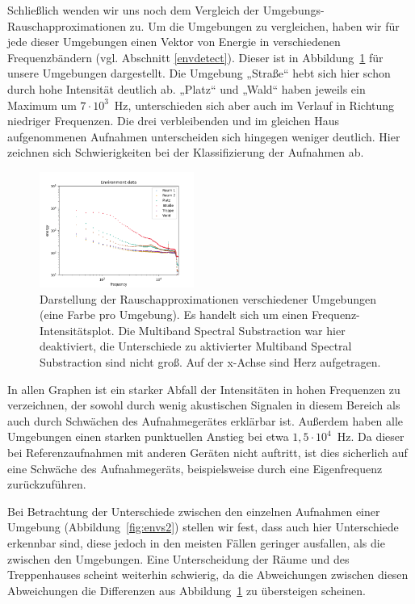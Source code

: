 \documentclass[
	fontsize=10.5pt,
	marginpar=false,
	ngerman,
	accentcolor=3d
	]{tudapub}
\begin{document}
Schließlich wenden wir uns noch dem Vergleich der Umgebungs-Rauschapproximationen zu. Um die Umgebungen zu vergleichen, haben wir für jede dieser Umgebungen einen Vektor von Energie in verschiedenen Frequenzbändern (vgl. Abschnitt \ref{envdetect}). Dieser ist in Abbildung~\ref{fig:envs} für unsere Umgebungen dargestellt. Die Umgebung „Straße“ hebt sich hier schon durch hohe Intensität deutlich ab. „Platz“ und „Wald“ haben jeweils ein Maximum um $7\cdot10^3$~Hz, unterschieden sich aber auch im Verlauf in Richtung niedriger Frequenzen. Die drei verbleibenden und im gleichen Haus aufgenommenen Aufnahmen unterscheiden sich hingegen weniger deutlich. Hier zeichnen sich Schwierigkeiten bei der Klassifizierung der Aufnahmen ab.

\begin{figure}[h]
	\centering
	\includegraphics[width=0.45\textwidth]{media/envs}
	\caption{Darstellung der Rauschapproximationen verschiedener Umgebungen (eine Farbe pro Umgebung). Es handelt sich um einen Frequenz-Intensitätsplot. Die Multiband Spectral Substraction war hier deaktiviert, die Unterschiede zu aktivierter Multiband Spectral Substraction sind nicht groß. Auf der x-Achse sind Herz aufgetragen.}
	\label{fig:envs}
\end{figure}

In allen Graphen ist ein starker Abfall der Intensitäten in hohen Frequenzen zu verzeichnen, der sowohl durch wenig akustischen Signalen in diesem Bereich als auch durch Schwächen des Aufnahmegerätes erklärbar ist. Außerdem haben alle Umgebungen einen starken punktuellen Anstieg bei etwa $1,5\cdot10^4$~Hz. Da dieser bei Referenzaufnahmen mit anderen Geräten nicht auftritt, ist dies sicherlich auf eine Schwäche des Aufnahmegeräts, beispielsweise durch eine Eigenfrequenz zurückzuführen.

Bei Betrachtung der Unterschiede zwischen den einzelnen Aufnahmen einer Umgebung (Abbildung~\ref{fig:envs2}) stellen wir fest, dass auch hier Unterschiede erkennbar sind, diese jedoch in den meisten Fällen geringer ausfallen, als die zwischen den Umgebungen. Eine Unterscheidung der Räume und des Treppenhauses scheint weiterhin schwierig, da die Abweichungen zwischen diesen Abweichungen die Differenzen aus Abbildung~\ref{fig:envs} zu übersteigen scheinen.
\end{document}
